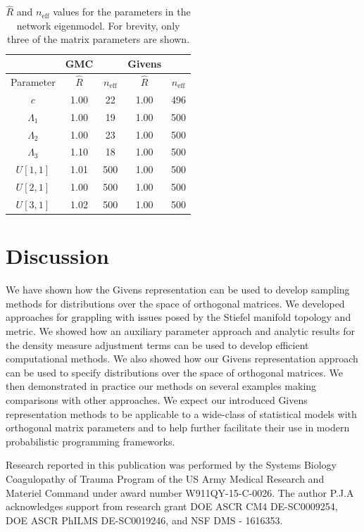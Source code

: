 \documentclass[ba]{imsart}
\numberwithin{equation}{section}
\theoremstyle{plain}
\begin{document}
\begin{table}
\begin{tabular}{|c||cc|cc|}
\hline
 & GMC & & Givens &\\
\hline
Parameter & $\hat{R}$ & $n_{\mathrm{eff}}$ & $\hat{R}$ & $n_{\mathrm{eff}}$\\
\hline
\hline
$c$ & 1.00 & 22 & 1.00 & 496\\
$\Lambda_1$ & 1.00 & 19 & 1.00 & 500\\
$\Lambda_2$ & 1.00 & 23 & 1.00 & 500\\
$\Lambda_3$ & 1.10 & 18 & 1.00 & 500\\
$U[1,1]$ & 1.01 & 500 & 1.00 & 500\\
$U[2,1]$ & 1.00 & 500 & 1.00 & 500\\
$U[3,1]$ & 1.02 & 500 & 1.00 & 500\\
\hline
\end{tabular}
\caption{$\hat{R}$ and $n_{\mathrm{eff}}$ values for the parameters in the network eigenmodel. For brevity, only three of the matrix parameters are shown.}
\label{tab:rhat_neff_eigennetwork}
\end{table}

\section{Discussion}\label{discussion}
We have shown how the Givens representation can be used to develop sampling methods for distributions over the space of orthogonal matrices. We developed approaches for grappling with issues posed by the Stiefel manifold topology and metric. We showed how an auxiliary parameter approach and analytic results for the density measure adjustment terms can be used to develop efficient computational methods. We also showed how our Givens representation approach can be used to specify distributions over the space of orthogonal matrices. We then demonstrated in practice our methods on several examples making comparisons with other approaches.  We expect our introduced Givens representation methods to be applicable to a wide-class of statistical models with orthogonal matrix parameters and to help further facilitate their use in modern probabilistic programming frameworks.

\begin{acknowledgement}
\noindent Research reported in this publication was performed by the Systems Biology Coagulopathy of Trauma Program of the US Army Medical Research and Materiel Command under award number W911QY-15-C-0026. The author P.J.A acknowledges support from research grant DOE ASCR CM4 DE-SC0009254, DOE ASCR PhILMS DE-SC0019246, and NSF DMS - 1616353.
\end{acknowledgement}
\end{document}
